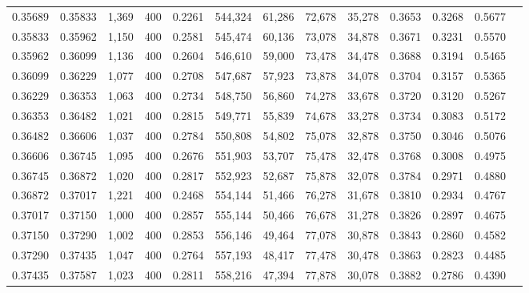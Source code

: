 \begin{tabular}{rrrrrrrrrrrrr}
0.35689 & 0.35833 &  1,369 & 400 &                                     0.2261 & 544,324 &  61,286 &  72,678 &  35,278 & 0.3653 & 0.3268 & 0.5677 \\
0.35833 & 0.35962 &  1,150 & 400 &                                     0.2581 & 545,474 &  60,136 &  73,078 &  34,878 & 0.3671 & 0.3231 & 0.5570 \\
0.35962 & 0.36099 &  1,136 & 400 &                                     0.2604 & 546,610 &  59,000 &  73,478 &  34,478 & 0.3688 & 0.3194 & 0.5465 \\
0.36099 & 0.36229 &  1,077 & 400 &                                     0.2708 & 547,687 &  57,923 &  73,878 &  34,078 & 0.3704 & 0.3157 & 0.5365 \\
0.36229 & 0.36353 &  1,063 & 400 &                                     0.2734 & 548,750 &  56,860 &  74,278 &  33,678 & 0.3720 & 0.3120 & 0.5267 \\
0.36353 & 0.36482 &  1,021 & 400 &                                     0.2815 & 549,771 &  55,839 &  74,678 &  33,278 & 0.3734 & 0.3083 & 0.5172 \\
0.36482 & 0.36606 &  1,037 & 400 &                                     0.2784 & 550,808 &  54,802 &  75,078 &  32,878 & 0.3750 & 0.3046 & 0.5076 \\
0.36606 & 0.36745 &  1,095 & 400 &                                     0.2676 & 551,903 &  53,707 &  75,478 &  32,478 & 0.3768 & 0.3008 & 0.4975 \\
0.36745 & 0.36872 &  1,020 & 400 &                                     0.2817 & 552,923 &  52,687 &  75,878 &  32,078 & 0.3784 & 0.2971 & 0.4880 \\
0.36872 & 0.37017 &  1,221 & 400 &                                     0.2468 & 554,144 &  51,466 &  76,278 &  31,678 & 0.3810 & 0.2934 & 0.4767 \\
0.37017 & 0.37150 &  1,000 & 400 &                                     0.2857 & 555,144 &  50,466 &  76,678 &  31,278 & 0.3826 & 0.2897 & 0.4675 \\
0.37150 & 0.37290 &  1,002 & 400 &                                     0.2853 & 556,146 &  49,464 &  77,078 &  30,878 & 0.3843 & 0.2860 & 0.4582 \\
0.37290 & 0.37435 &  1,047 & 400 &                                     0.2764 & 557,193 &  48,417 &  77,478 &  30,478 & 0.3863 & 0.2823 & 0.4485 \\
0.37435 & 0.37587 &  1,023 & 400 &                                     0.2811 & 558,216 &  47,394 &  77,878 &  30,078 & 0.3882 & 0.2786 & 0.4390 \\

\end{tabular}
